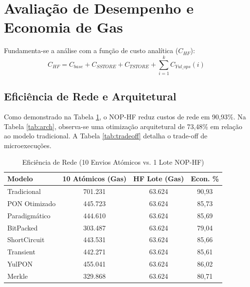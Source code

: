 \documentclass[conference]{IEEEtran}
\begin{document}
\section{Avaliação de Desempenho e Economia de Gas}
Fundamenta-se a análise com a função de custo analítica ($C_{HF}$):
\begin{equation}
C_{HF} = C_{base} + C_{SSTORE} + C_{TSTORE} + \sum_{i=1}^{k} C_{Yul\_ops}(i)
\end{equation}

\subsection{Eficiência de Rede e Arquitetural}

Como demonstrado na Tabela \ref{tab:network}, o NOP-HF reduz custos de rede em 90,93\%. Na Tabela \ref{tab:arch}, observa-se uma otimização arquitetural de 73,48\% em relação ao modelo tradicional. A Tabela \ref{tab:tradeoff} detalha o trade-off de microexecuções.

\begin{table}[htbp]
\caption{Eficiência de Rede (10 Envios Atómicos vs. 1 Lote NOP-HF)}
\begin{center}
\begin{tabular}{|l|c|c|c|}
\hline
\textbf{Modelo} & \textbf{10 Atómicos (Gas)} & \textbf{HF Lote (Gas)} & \textbf{Econ. \%} \\
\hline
Tradicional   & 701.231 & 63.624 & 90,93 \\
PON Otimizado & 445.723 & 63.624 & 85,73 \\
Paradigmático & 444.610 & 63.624 & 85,69 \\
BitPacked     & 303.487 & 63.624 & 79,04 \\
ShortCircuit  & 443.531 & 63.624 & 85,66 \\
Transient     & 442.271 & 63.624 & 85,61 \\
YulPON        & 455.041 & 63.624 & 86,02 \\
Merkle        & 329.868 & 63.624 & 80,71 \\
\hline
\end{tabular}
\label{tab:network}
\end{center}
\end{table}
\end{document}
